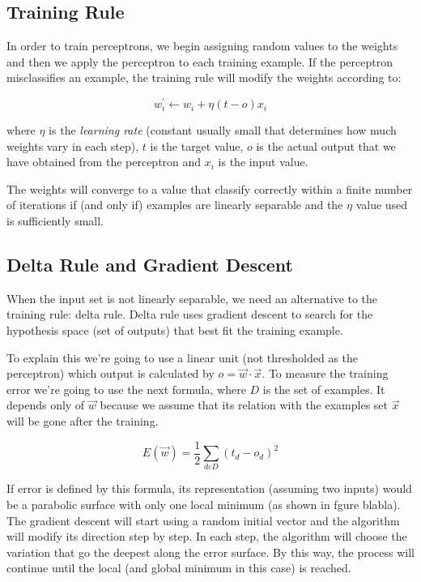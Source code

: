 	\subsection{Training Rule}
	In order to train perceptrons, we begin assigning random values to the weights and then we apply the perceptron to each training example. If the perceptron misclassifies an example, the training rule will modify the weights according to:

	\begin{equation}
		\label{training_rule}
		w_{i}^{'} \leftarrow w_{i} + \eta (t - o) x_{i}
	\end{equation}

	where $\eta$ is the \textit{learning rate} (constant usually small that determines how much weights vary in each step), $t$ is the target value, $o$ is the actual output that we have obtained from the perceptron and $x_{i}$ is the input value.

	The weights will converge to a value that classify correctly within a finite number of iterations if (and only if) examples are linearly separable and the $\eta$ value used is sufficiently small.
	
	\subsection{Delta Rule and Gradient Descent}
	When the input set is not linearly separable, we need an alternative to the training rule: delta rule. Delta rule uses gradient descent to search for the hypothesis space (set of outputs) that best fit the training example. 

	To explain this we’re going to use a linear unit (not thresholded as the perceptron) which output is calculated by $o = \vec{w} \cdot \vec{x}$. To measure the training error we’re going to use the next formula, where $D$ is the set of examples. It depends only of $\vec{w}$ because we assume that its relation with the examples set $\vec{x}$ will be gone after the training.

	\begin{equation}
		\label{error_function_full_square}
		E(\vec{w}) = \frac{1}{2} \sum_{d \varepsilon D} (t_d-o_d)^2 
	\end{equation}

	If error is defined by this formula, its representation (assuming two inputs) would be a parabolic surface with only one local minimum (as shown in fgure blabla). The gradient descent will start using a random initial vector and the algorithm will modify its direction step by step. In each step, the algorithm will choose the variation that go the deepest along the error surface. By this way, the process will continue until the local (and global minimum in this case) is reached.

